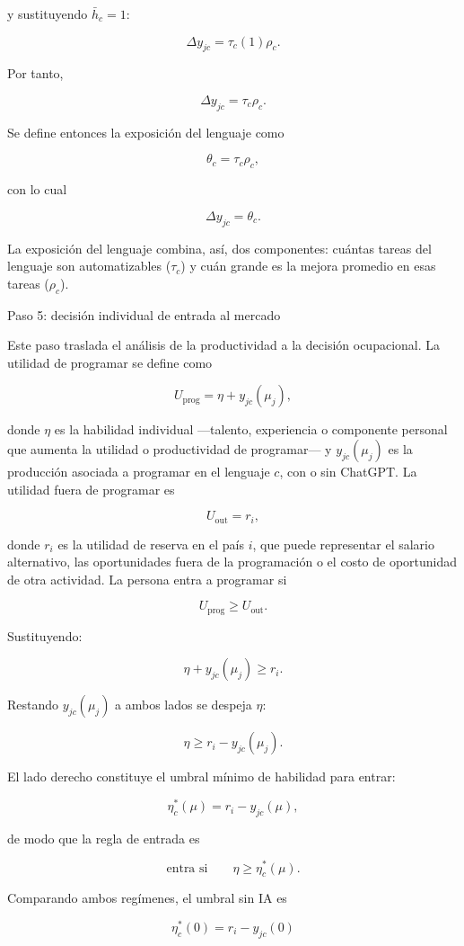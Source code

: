 \documentclass[12pt,a4paper]{article}
\let\textbf\textmd
\newcommand{\Uprog}{U_{\mathrm{prog}}}
\newcommand{\Uout}{U_{\mathrm{out}}}
\begin{document}
y sustituyendo $\bar h_c=1$:

\[
\Delta y_{jc}=\tau_c(1)\rho_c.
\]

Por tanto,

\[
\Delta y_{jc}=\tau_c\rho_c.
\]

Se define entonces la exposición del lenguaje como

\[
\theta_c=\tau_c\rho_c,
\]

con lo cual

\[
\Delta y_{jc}=\theta_c.
\]

La exposición del lenguaje combina, así, dos componentes: cuántas tareas del lenguaje son automatizables ($\tau_c$) y cuán grande es la mejora promedio en esas tareas ($\rho_c$).

\bigskip
\noindent\textbf{Paso 5: decisión individual de entrada al mercado}

\medskip
\noindent Este paso traslada el análisis de la productividad a la decisión ocupacional. La utilidad de programar se define como

\[
\Uprog=\eta+y_{jc}(\mu_j),
\]

donde $\eta$ es la habilidad individual —talento, experiencia o componente personal que aumenta la utilidad o productividad de programar— y $y_{jc}(\mu_j)$ es la producción asociada a programar en el lenguaje $c$, con o sin ChatGPT. La utilidad fuera de programar es

\[
\Uout=r_i,
\]

donde $r_i$ es la utilidad de reserva en el país $i$, que puede representar el salario alternativo, las oportunidades fuera de la programación o el costo de oportunidad de otra actividad. La persona entra a programar si

\[
\Uprog\geq\Uout.
\]

Sustituyendo:

\[
\eta+y_{jc}(\mu_j)\geq r_i.
\]

Restando $y_{jc}(\mu_j)$ a ambos lados se despeja $\eta$:

\[
\eta\geq r_i-y_{jc}(\mu_j).
\]

El lado derecho constituye el umbral mínimo de habilidad para entrar:

\[
\eta_c^*(\mu)=r_i-y_{jc}(\mu),
\]

de modo que la regla de entrada es

\[
\text{entra si}\qquad \eta\geq \eta_c^*(\mu).
\]

Comparando ambos regímenes, el umbral sin IA es

\[
\eta_c^*(0)=r_i-y_{jc}(0)
\]
\end{document}
